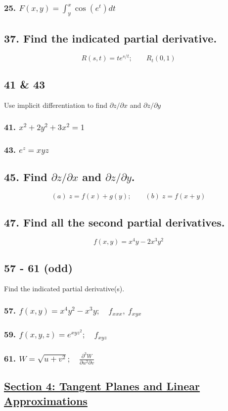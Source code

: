 \documentclass{article}
\begin{document}
\subsubsection*{25. $F(x,y) = \int_y^x \cos (e^t) dt$}
\subsection*{37. Find the indicated partial derivative.}
\[
    R(s,t) = te^{s/t}; \qquad R_t (0,1)
\]
\subsection*{41 \& 43}
Use implicit differentiation to find $\partial z / \partial x$ and $\partial z / \partial y$
\subsubsection*{41. $x^2 + 2y^2 + 3x^2 = 1$}
\subsubsection*{43. $e^z = xyz$}
\subsection*{45. Find $\partial z / \partial x$ and $\partial z / \partial y$.}
\[
    (a)\; z = f(x) + g(y); \qquad (b)\; z = f(x + y) 
\]
\subsection*{47. Find all the second partial derivatives.}
\[
    f(x,y) = x^4y - 2x^3y^2
\]
\subsection*{57 - 61 (odd)}
Find the indicated partial derivative(s).
\subsubsection*{57. $f(x,y) = x^4y^2 - x^3y;\quad f_{xxx},\: f_{xyx}$}
\subsubsection*{59. $f(x,y,z) = e^{xyz^2}; \quad f_{xyz}$}
\subsubsection*{61. $W = \sqrt{u + v^2}; \quad \displaystyle\frac{\partial^3 W}{\partial u^2 \partial v}$}
\newpage
\begin{center}
    \section*{\underline{Section 4: Tangent Planes and Linear Approximations}}
\end{center}
\end{document}
